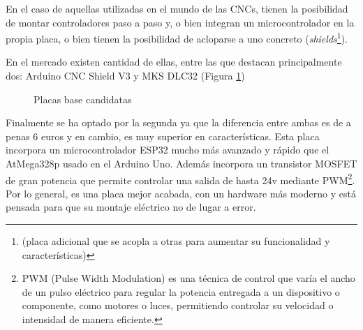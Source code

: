 En el caso de aquellas utilizadas en el mundo de las CNCs, tienen la posibilidad de montar controladores paso a paso y, o bien 
integran un microcontrolador en la propia placa, o bien tienen la posibilidad de acloparse a uno concreto
(\textit{shields}\footnote{(placa adicional que se acopla a otras para aumentar su funcionalidad y características)}).  



En el mercado existen cantidad de ellas, entre las que destacan principalmente dos: Arduino CNC Shield V3 y MKS DLC32 (Figura \ref{fig:placas_candidatas})
\begin{figure} [h!]
  \centering    
  \hspace{0.5cm}
  \caption[Placas base candidatas]{Placas base candidatas}
  \label{fig:placas_candidatas}
\end{figure}
 
Finalmente se ha optado por la segunda ya que la diferencia entre ambas es de a penas 6 euros y en cambio, es muy superior en características. Esta placa 
incorpora un microcontrolador ESP32 mucho más avanzado y rápido que el AtMega328p usado en el Arduino Uno. Además incorpora un transistor MOSFET de 
gran potencia que permite controlar una salida de hasta 24v mediante PWM\footnote{
PWM (Pulse Width Modulation) es una técnica de control que varía el ancho de un pulso eléctrico para regular la potencia entregada a un dispositivo o 
componente, como motores o luces, permitiendo controlar su velocidad o intensidad de manera eficiente.}. Por lo general, es una placa mejor acabada, 
con un hardware más moderno y está pensada para que su montaje eléctrico no de lugar a error.

